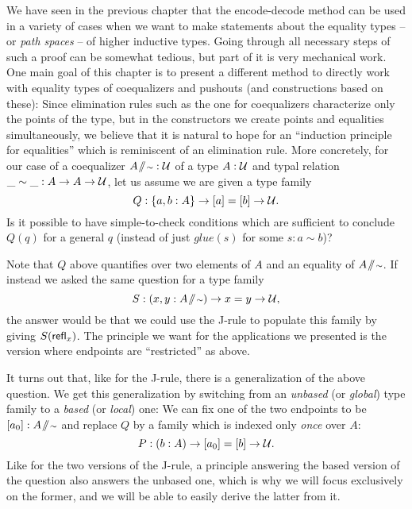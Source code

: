 We have seen in the previous chapter that the encode-decode method can be used
in a variety of cases when we want to make statements about the equality
types -- or \emph{path spaces} -- of higher inductive types.
Going through all necessary steps of such a proof can be somewhat tedious, but
part of it is very mechanical work.
One main goal of this chapter is to present a different method to
directly work with equality types of coequalizers and pushouts
(and constructions based on these):
Since elimination rules such as the one for coequalizers characterize only
the points  of the type, but in the constructors we create points
and equalities simultaneously, we believe that it is natural to hope for
an ``induction principle for equalities'' which is reminiscent of an elimination
rule.
More concretely, for our case of a coequalizer $A \! \sslash \! {\scriptstyle \sim} : \mathcal{U}$ of a type $A : \mathcal{U}$
and typal relation $\_\sim\_ : A \to A \to \mathcal{U}$,
let us assume we are given a type family
\begin{equation*}
Q: \{a, b : A\} \to [a] = [b] \to \mathcal{U} \text{.}
\end{equation*}
Is it possible to have simple-to-check conditions which are sufficient to
conclude $Q(q)$ for a general $q$ (instead of just $glue(s)$ for some $s : a \sim b$)?

\begin{remark}
Note that $Q$ above quantifies over two elements of $A$ and an equality of $A \! \sslash \! {\scriptstyle \sim}$.
If instead we asked the same question for a type family
\begin{equation*}
S: (x, y : A \! \sslash \! {\scriptstyle \sim}) \to x = y \to \mathcal{U} \text{,}
\end{equation*}
the answer would be that we could use the J-rule to populate this family by giving
$S(\mathsf{refl}_x)$.
The principle we want for the applications we presented is the version
where endpoints are ``restricted'' as above.
\end{remark}

It turns out that, like for the J-rule, there is a generalization of the above question.
We get this generalization by switching from an \emph{unbased} (or \emph{global}) type family
to a \emph{based} (or \emph{local}) one:
We can fix one of the two endpoints to be $[a_0] : A \! \sslash \! {\scriptstyle \sim}$ and replace $Q$
by a family which is indexed only \emph{once} over $A$:
\begin{equation}
P : (b : A) \to [a_0] = [b] \to \mathcal{U} \text{.}
\end{equation}
Like for the two versions of the J-rule, a principle answering the based version
of the question also answers the unbased one, which is why we will focus
exclusively on the former, and we will be able to easily derive the latter from it.

